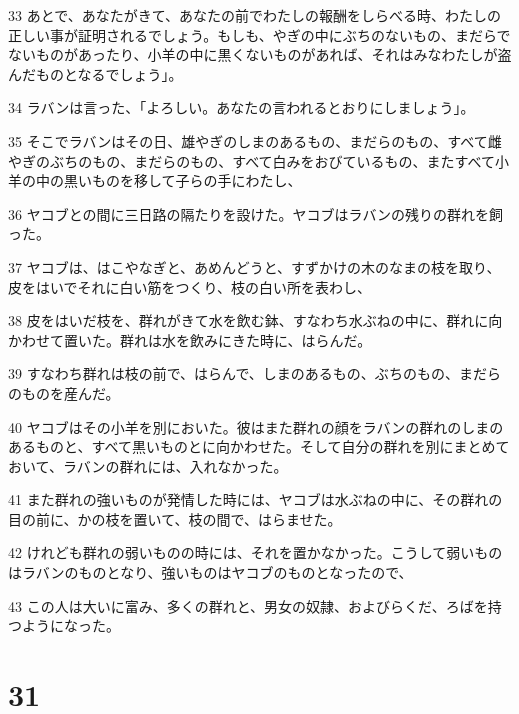 \par 33 あとで、あなたがきて、あなたの前でわたしの報酬をしらべる時、わたしの正しい事が証明されるでしょう。もしも、やぎの中にぶちのないもの、まだらでないものがあったり、小羊の中に黒くないものがあれば、それはみなわたしが盗んだものとなるでしょう」。
\par 34 ラバンは言った、「よろしい。あなたの言われるとおりにしましょう」。
\par 35 そこでラバンはその日、雄やぎのしまのあるもの、まだらのもの、すべて雌やぎのぶちのもの、まだらのもの、すべて白みをおびているもの、またすべて小羊の中の黒いものを移して子らの手にわたし、
\par 36 ヤコブとの間に三日路の隔たりを設けた。ヤコブはラバンの残りの群れを飼った。
\par 37 ヤコブは、はこやなぎと、あめんどうと、すずかけの木のなまの枝を取り、皮をはいでそれに白い筋をつくり、枝の白い所を表わし、
\par 38 皮をはいだ枝を、群れがきて水を飲む鉢、すなわち水ぶねの中に、群れに向かわせて置いた。群れは水を飲みにきた時に、はらんだ。
\par 39 すなわち群れは枝の前で、はらんで、しまのあるもの、ぶちのもの、まだらのものを産んだ。
\par 40 ヤコブはその小羊を別においた。彼はまた群れの顔をラバンの群れのしまのあるものと、すべて黒いものとに向かわせた。そして自分の群れを別にまとめておいて、ラバンの群れには、入れなかった。
\par 41 また群れの強いものが発情した時には、ヤコブは水ぶねの中に、その群れの目の前に、かの枝を置いて、枝の間で、はらませた。
\par 42 けれども群れの弱いものの時には、それを置かなかった。こうして弱いものはラバンのものとなり、強いものはヤコブのものとなったので、
\par 43 この人は大いに富み、多くの群れと、男女の奴隷、およびらくだ、ろばを持つようになった。

\chapter{31}

